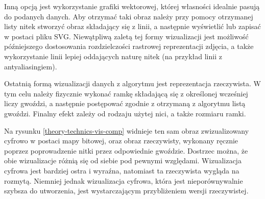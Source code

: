         Inną opcją jest wykorzystanie grafiki wektorowej, której własności idealnie pasują do podanych danych. Aby otrzymać taki obraz należy przy pomocy otrzymanej listy nitek stworzyć obraz składający się z linii, a następnie wyświetlić lub zapisać w postaci pliku SVG. Niewątpliwą zaletą tej formy wizualizacji jest możliwość późniejszego dostosowania rozdzielczości rastrowej reprezentacji zdjęcia, a także wykorzystanie linii lepiej oddających naturę nitek (na przykład linii z antyaliasingiem).
        
        Ostatnią formą wizualizacji danych z algorytmu jest reprezentacja rzeczywista. W tym celu należy fizycznie wykonać ramkę składającą się z określonej wcześniej liczy gwoździ, a następnie postępować zgodnie z otrzymaną z algorytmu listą gwoździ. Finalny efekt zależy od rodzaju użytej nici, a także rozmiaru ramki.
        
        Na rysunku \ref{theory-technics-vis-comp} widnieje ten sam obraz zwizualizowany cyfrowo w postaci mapy bitowej, oraz obraz rzeczywisty, wykonany ręcznie poprzez poprowadzenie nitki przez odpowiednie gwoździe. Dostrzec można, że obie wizualizacje różnią się od siebie pod pewnymi względami. Wizualizacja cyfrowa jest bardziej ostra i wyraźna, natomiast ta rzeczywista wygląda na rozmytą. Niemniej jednak wizualizacja cyfrowa, która jest nieporównywalnie szybsza do utworzenia, jest wystarczającym przybliżeniem wersji rzeczywistej. 
    
